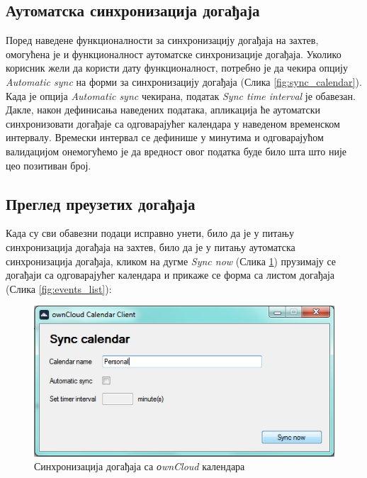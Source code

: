 \subsection{Аутоматска синхронизација догађаја}

Поред наведене функционалности за синхронизацију догађаја на захтев, омогућена је и функционалност аутоматске синхронизације догађаја. Уколико корисник жели да користи дату функционалност, потребно је да чекира опцију \textit{Automatic sync} на форми за синхронизацију догађаја (Слика \ref{fig:sync_calendar}). Када је опција \textit{Automatic sync} чекирана, податак \textit{Sync time interval} је обавезан. Дакле, након дефинисања наведених података, апликација ће аутоматски синхронизовати догађаје са одговарајућег календара у наведеном временском интервалу. Времески интервал се дефинише у минутима и одговарајућом валидацијом онемогућемо је да вредност овог податка буде било шта што није цео позитиван број.

\subsection{Преглед преузетих догађаја}
Када су сви обавезни подаци исправно унети, било да је у питању синхронизација догађаја на захтев, било да је у питању аутоматска синхронизација догађаја, кликом на дугме \textit{Sync now} (Слика \ref{fig:sync_calendar_personal}) прузимају се догађаји са одговарајућег календара и прикаже се форма са листом догађаја (Слика \ref{fig:events_list}):

\begin{figure}[H]
	\centering
	\includegraphics[scale=0.5]{slike/SyncCalendarPersonal.png}
	\caption{Синхронизација догађаја са \textit{оwnCloud} календара}
	\label{fig:sync_calendar_personal}
\end{figure}

